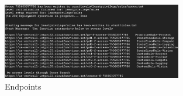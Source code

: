 \begin{figure}[h]
  \centering
  \includegraphics[width=0.7\textwidth]{pic/endpoints}
  \caption {Endpoints}
   \label{fig:endpoints}
\end{figure}
